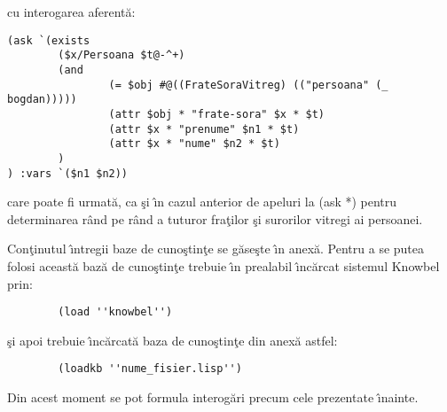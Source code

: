 \documentclass{article}
\begin{document}
cu interogarea aferent\u{a}:

{\scriptsize
\begin{verbatim}
(ask `(exists
        ($x/Persoana $t@-^+)
        (and
                (= $obj #@((FrateSoraVitreg) (("persoana" (_ bogdan)))))
                (attr $obj * "frate-sora" $x * $t)
                (attr $x * "prenume" $n1 * $t)
                (attr $x * "nume" $n2 * $t)
        )
) :vars `($n1 $n2))
\end{verbatim}
}

care poate fi urmat\u{a}, ca \c{s}i \^{\i}n cazul anterior de apeluri la
{\scriptsize (ask *)} pentru determinarea r\^{a}nd pe r\^{a}nd a  tuturor
fra\c{t}ilor \c{s}i surorilor vitregi ai persoanei.

Con\c{t}inutul \^{\i}ntregii baze de cuno\c{s}tin\c{t}e se g\u{a}se\c{s}te
\^{\i}n anex\u{a}. Pentru a se putea folosi aceast\u{a} baz\u{a} de
cuno\c{s}tin\c{t}e trebuie \^{\i}n prealabil \^{\i}nc\u{a}rcat sistemul
Knowbel prin:

{\scriptsize
\begin{verbatim}
        (load ''knowbel'')
\end{verbatim}
}

\c{s}i apoi trebuie \^{\i}nc\u{a}rcat\u{a} baza de cuno\c{s}tin\c{t}e
din anex\u{a} astfel:

{\scriptsize
\begin{verbatim}
        (loadkb ''nume_fisier.lisp'')
\end{verbatim}
}

Din acest moment se pot formula interog\u{a}ri precum cele prezentate
\^{\i}nainte.

\appendix
\end{document}
